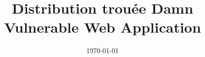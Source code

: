 \documentclass[a4paper,12pt]{article}
\title{Distribution trouée Damn Vulnerable Web Application}
\date{\today}
\begin{document}
\newcommand{\scaledvwa}{0.4} 
\newcommand{\scalekad}{0.45}


\pagebreak

\tableofcontents
\justify







\newpage
\appendix
%
%

\newpage
\nocite{*}  %


\renewcommand{\refname}{Bibliographie}





\end{document}
